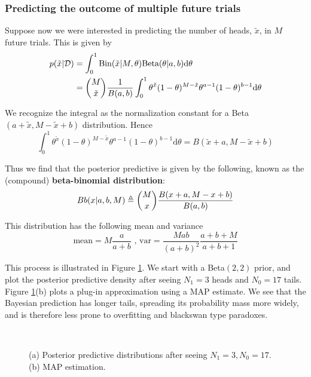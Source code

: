 \subsubsection{Predicting the outcome of multiple future trials}
Suppose now we were interested in predicting the number of heads, $\tilde{x}$, in $M$ future trials. This is given by
\begin{align}
p(\tilde{x}|\mathcal{D})& =\int_0^1 \text{Bin}(\tilde{x}|M,\theta)\text{Beta}(\theta|a,b)\mathrm{d}\theta \\
                        & =\dbinom{M}{\tilde{x}}\dfrac{1}{B(a,b)}\int_0^1 \theta^{\tilde{x}}(1-\theta)^{M-\tilde{x}}\theta^{a-1}(1-\theta)^{b-1}\mathrm{d}\theta
\end{align}

We recognize the integral as the normalization constant for a Beta$(a+\tilde{x}, M−\tilde{x}+b)$ distribution. Hence
\begin{equation}
\int_0^1 \theta^{\tilde{x}}(1-\theta)^{M-\tilde{x}}\theta^{a-1}(1-\theta)^{b-1}\mathrm{d}\theta=B(\tilde{x}+a,M-\tilde{x}+b)
\end{equation}

Thus we find that the posterior predictive is given by the following, known as the (compound) \textbf{beta-binomial distribution}:
\begin{equation}
Bb(x|a,b,M) \triangleq \dbinom{M}{x}\dfrac{B(x+a,M-x+b)}{B(a,b)}
\end{equation}

This distribution has the following mean and variance
\begin{equation}
\text{mean}=M\dfrac{a}{a+b} \text{ , var}=\dfrac{Mab}{(a+b)^2}\dfrac{a+b+M}{a+b+1}
\end{equation}

This process is illustrated in Figure \ref{fig:beta-binomial-distribution}. We start with a Beta$(2,2)$ prior, and plot the posterior predictive density after seeing $N_1 =3$ heads and $N_0 =17$ tails. Figure \ref{fig:beta-binomial-distribution}(b) plots a plug-in approximation using a MAP estimate. We see that the Bayesian prediction has longer tails, spreading its probability mass more widely, and is therefore less prone to overfitting and blackswan type paradoxes.

\begin{figure}[hbtp]
\centering
{} \\
\caption{(a) Posterior predictive distributions after seeing $N_1=3,N_0=17$. (b) MAP estimation.}
\label{fig:beta-binomial-distribution} 
\end{figure}


